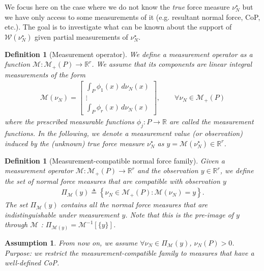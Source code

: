 \documentclass[11pt,a4paper]{article}
\theoremstyle{plain}
\newtheorem{definition}[theorem]{Definition}
\newtheorem{assumption}[theorem]{Assumption}
\newcommand{\R}{\mathbb{R}}
\begin{document}
We focus here on the case where we do not know the \textit{true} force measure $\nu_N^\star$ but we have only access to some measurements of it (e.g. resultant normal force, CoP, etc.). 
The goal is to investigate what can be known about the support of $\mathcal W(\nu_N^\star)$ given partial measurements of $\nu_N^\star$. 
\begin{definition}[Measurement operator]\label{def:measurement_operator}
    We define a \textit{measurement operator} as a function $\mathcal M:\mathcal M_+(P)\rightarrow\mathbb R^r$. We assume that its components are linear integral measurements of the form
    \begin{align}
    \mathcal M(\nu_N) = 
    \begin{bmatrix}
    \displaystyle\int_P \phi_1(x)\,d\nu_N(x)\\
    \vdots\\
    \displaystyle\int_P \phi_r(x)\,d\nu_N(x)
    \end{bmatrix},\qquad \forall \nu_N \in \mathcal M_+(P)
    \end{align}
    where the prescribed measurable functions
    $\phi_j:P\rightarrow\mathbb R$ are called the \textit{measurement functions}.
    In the following, we denote a measurement value (or observation) induced by the (unknown) true force measure $\nu_N^\star$ as $y = \mathcal M(\nu_N^\star) \in\mathbb R^r$.
\end{definition}

\begin{definition}[Measurement-compatible normal force family]
    Given a measurement operator $\mathcal M:\mathcal M_+(P)\rightarrow\mathbb R^r$ and the observation $y\in\R^r$, we define the set of \textit{normal force measures that are compatible with observation $y$} 
    \begin{align}
    \Pi_{\mathcal M}(y) \triangleq\left\{\nu_N\in\mathcal M_+(P):\mathcal M(\nu_N)=y\right\}.
    \end{align}
    The set $\Pi_{\mathcal M}(y)$ contains all the normal force measures that are indistinguishable under measurement $y$. Note that this is the pre-image of $y$ through $\mathcal{M}$ : $\Pi_{\mathcal{M}(y)} = \mathcal{M}^{-1}[\{y\}]$.
\end{definition}

\begin{assumption}
    \label{ass:positive_mass}
    From now on, we assume \(\forall \nu_N\in\Pi_{\mathcal M}(y)\), $\nu_N(P) >0$. Purpose: we restrict the measurement-compatible family to measures that have a well-defined CoP.
\end{assumption}
\end{document}
